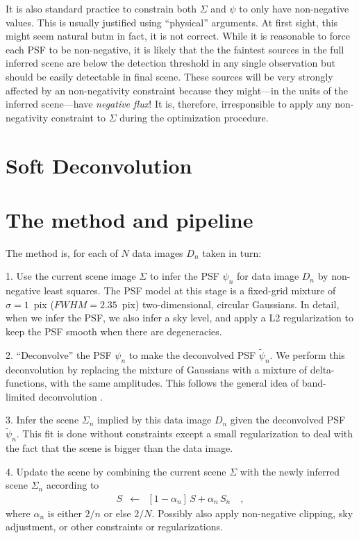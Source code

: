 \documentclass[12pt,preprint]{aastex}
\newcommand{\data}{\ensuremath{D}}
\newcommand{\scene}{\ensuremath{\Sigma}}
\newcommand{\psf}{\ensuremath{\psi}}
\newcommand{\dpsf}{\ensuremath{\tilde{\psi}}}
\begin{document}
It is also standard practice to constrain both $\scene$ and $\psf$ to only
have non-negative values. This is usually justified using ``physical''
arguments. At first sight, this might seem natural butm in fact, it is not
correct. While it is reasonable to force each PSF to be non-negative, it
is likely that the the faintest sources in the full inferred scene are
below the detection threshold in any single observation but should be
easily detectable in final scene. These sources will be very strongly
affected by an non-negativity constraint because they might---in the units
of the inferred scene---have \emph{negative flux}! It is, therefore,
irresponsible to apply any non-negativity constraint to $\scene$ during
the optimization procedure.

\section{Soft Deconvolution}

\section{The method and pipeline}

The method is, for each of $N$ data images $\data_n$ taken in turn:

1. Use the current scene image $\scene$ to infer the PSF $\psf_n$ for data
image $\data_n$ by non-negative least squares.  The PSF model at this
stage is a fixed-grid mixture of $\sigma=1$~pix ($FWHM = 2.35$~pix)
two-dimensional, circular Gaussians.  In detail, when we infer the
PSF, we also infer a sky level, and apply a L2 regularization to keep
the PSF smooth when there are degeneracies.

2. ``Deconvolve'' the PSF $\psf_n$ to make the deconvolved PSF
$\dpsf_n$. We perform this deconvolution by replacing the mixture of
Gaussians with a mixture of delta-functions, with the same amplitudes.
This follows the general idea of band-limited deconvolution
\citep{magain}.

3. Infer the scene $\scene_n$ implied by this data image $\data_n$ given the
deconvolved PSF $\dpsf_n$.  This fit is done without constraints
except a small regularization to deal with the fact that the scene is
bigger than the data image.

4. Update the scene by combining the current scene $\scene$ with the newly
inferred scene $\scene_n$ according to
\begin{eqnarray}\displaystyle
S &\leftarrow& [1-\alpha_n]\,S + \alpha_n\,S_n
\quad ,
\end{eqnarray}
where $\alpha_n$ is either $2/n$ or else $2/N$.  Possibly also apply
non-negative clipping, sky adjustment, or other constraints or
regularizations.
\end{document}
